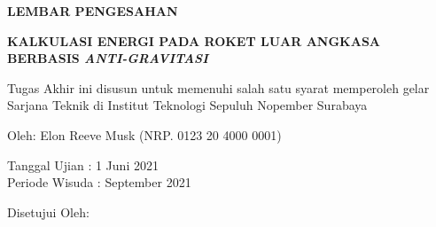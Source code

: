 \begin{center}
	\large\textbf{LEMBAR PENGESAHAN}
\end{center}

\thispagestyle{empty}

\begin{center}
  \textbf{KALKULASI ENERGI PADA ROKET LUAR ANGKASA BERBASIS \emph{ANTI-GRAVITASI}}
\end{center}

\begingroup
  \small

  \begin{center}
    Tugas Akhir ini disusun untuk memenuhi salah satu syarat memperoleh gelar Sarjana Teknik di Institut Teknologi Sepuluh Nopember Surabaya
  \end{center}

  \begin{center}
    Oleh: Elon Reeve Musk (NRP. 0123 20 4000 0001)
  \end{center}

  \begin{center}
    Tanggal Ujian : 1 Juni 2021\\
    Periode Wisuda : September 2021
  \end{center}

  \begin{center}
    Disetujui Oleh:
  \end{center}

  \begingroup
    \setlength{\tabcolsep}{0pt}

